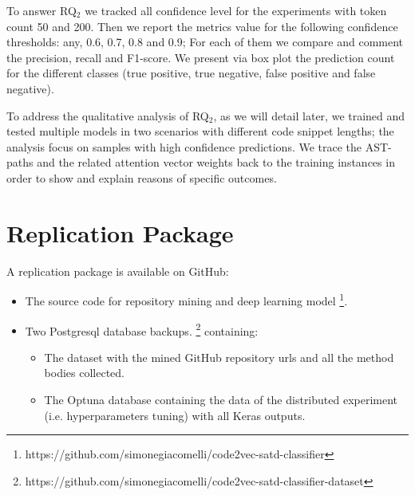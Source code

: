 To answer RQ$_2$ we tracked all confidence level for the experiments with token count 50 and 200. Then we report the metrics value for the following confidence thresholds: any, 0.6, 0.7, 0.8 and 0.9; For each of them we compare and comment the precision, recall and F1-score. We present via box plot the prediction count for the different classes (true positive, true negative, false positive and false negative). 

To address the qualitative analysis of RQ$_2$, as we will detail later, we trained and tested multiple models in two scenarios with different code snippet lengths; the analysis focus on samples with high confidence predictions. We trace the AST-paths and the related attention vector weights back to the training instances in order to show and explain reasons of specific outcomes.



\section{Replication Package}
A replication package is available on GitHub:
\begin{itemize}
    \item The source code for repository mining and deep learning model \footnote{https://github.com/simonegiacomelli/code2vec-satd-classifier}. 
    \item Two Postgresql database backups. \footnote{https://github.com/simonegiacomelli/code2vec-satd-classifier-dataset } containing:
    \begin{itemize}
\item The dataset with the mined GitHub repository urls and all the method bodies collected.
\item The Optuna database containing the data of the distributed experiment (i.e. hyperparameters tuning) with all Keras outputs. 
\end{itemize}
\end{itemize}
